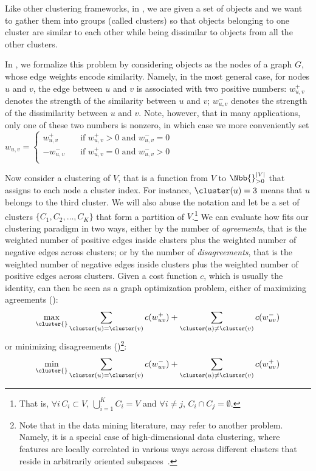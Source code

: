 Like other clustering frameworks, in \pcc{}, we are given a set of objects and we want to gather
them into groups (called clusters) so that objects belonging to one cluster are similar to each
other while being dissimilar to objects from all the other clusters.

In \pcc{}, we formalize this problem by considering objects as the nodes of a graph $G$, whose edge
weights encode similarity. Namely, in the most general case, for nodes $u$ and $v$, the edge between
$u$ and $v$ is associated with two positive numbers:
$w_{u,v}^+$ denotes the strength of the similarity between $u$ and $v$;
$w_{u,v}^-$ denotes the strength of the dissimilarity between $u$ and $v$.
Note, however, that in many applications, only one of these two numbers is nonzero, in which case
we more conveniently set $w_{u,v} = \begin{cases}
	 w_{u,v}^+ & \quad \text{if } w_{u,v}^+ > 0 \text{ and } w_{u,v}^-=0 \\
	-w_{u,v}^- & \quad \text{if } w_{u,v}^+ = 0 \text{ and } w_{u,v}^->0 \\
\end{cases}$


Now consider a clustering \cluster{} of $V$, that is a function from $V$ to $\Nbb{}^{|V|}_{>0}$ that
assigns to each node a cluster index. For instance, $\cluster(u) = 3$ means that $u$ belongs to the
third cluster. We will also abuse the notation and let \cluster{} be a set of clusters $\{C_1, C_2,
\ldots, C_K\}$ that form a partition of $V$.\footnote{That is, $\forall i\,C_i\subset V$,
$\bigcup_{i=1}^K C_i = V$ and $\forall i\neq j,\, C_i\cap C_j = \emptyset$.}
We can evaluate how \cluster{} fits our clustering paradigm in two ways,
either by the number of \emph{agreements}, that is the weighted number of positive edges inside
clusters plus the weighted number of negative edges across clusters; or by the number of
\emph{disagreements}, that is the weighted number of negative edges inside clusters plus the
weighted number of positive edges across clusters. Given a cost function $c$, which is usually the
identity, \pcc{} can then be seen as a graph optimization problem, either of maximizing agreements
(\maxa{}):
\begin{equation}
	\max_{\cluster{}} \sum_{\cluster(u) = \cluster(v)} c(w_{uv}^+) +
	\sum_{\cluster(u) \neq \cluster(v)} c(w_{uv}^-)
	\label{eq:maxa}
\end{equation}
or minimizing disagreements (\mind{})\footnote{Note that in the data mining literature, \pcc{} may
refer to another problem. Namely, it is a special case of high-dimensional data clustering, where
features are locally correlated in various ways across different clusters that reside in arbitrarily
oriented subspaces~\autocite{otherCCproblem09}.}:
\begin{equation}
	\min_{\cluster{}} \sum_{\cluster(u) = \cluster(v)} c(w_{uv}^-) +
	\sum_{\cluster(u) \neq \cluster(v)} c(w_{uv}^+)
	\label{eq:mind}
\end{equation}

